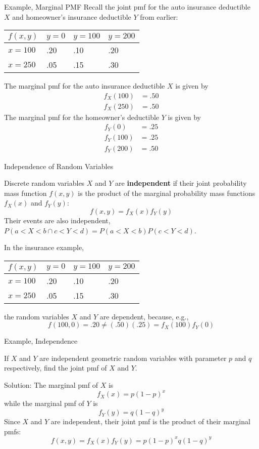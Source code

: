 \documentclass[handout]{beamer}
\begin{document}
\begin{frame}{Example, Marginal PMF}
    Recall the joint pmf for the auto insurance deductible $X$ and homeowner's insurance deductible $Y$ from earlier:
    \begin{center}
        \begin{tabular}{l||l|l|l}
            $f(x,y)$ & $y=0$ & $y=100$ & $y=200$ \\ \hline \hline
            $x=100$  & .20   & .10     & .20     \\ \hline
            $x=250$  & .05   & .15     & .30
        \end{tabular}
    \end{center}
    \pause The marginal pmf for the auto insurance deductible $X$ is given by
    \begin{align*}
        f_X(100) & = .50 \\
        f_X(250) & = .50
    \end{align*}
    \pause The marginal pmf for the homeowner's deductible $Y$ is given by
    \begin{align*}
        f_Y(0)   & = .25 \\
        f_Y(100) & = .25 \\
        f_Y(200) & = .50
    \end{align*}
\end{frame}
\begin{frame}{Independence of Random Variables}
    \begin{block}{}
        Discrete random variables $X$ and $Y$ are \textbf{independent} if their joint probability mass function $f(x,y)$ is the product of the marginal probability mass functions $f_X(x)$ and $f_Y(y)$:
        $$f(x,y) = f_X(x)f_Y(y)$$
        Their events are also independent, $P(a<X<b \cap c<Y<d) = P(a<X<b)P(c<Y<d)$.
    \end{block}

    In the insurance example,
    \begin{center}
        \begin{tabular}{l||l|l|l}
            $f(x,y)$ & $y=0$ & $y=100$ & $y=200$ \\ \hline \hline
            $x=100$  & .20   & .10     & .20     \\ \hline
            $x=250$  & .05   & .15     & .30
        \end{tabular}
    \end{center}
    the random variables $X$ and $Y$ are dependent, because, e.g.,
    $$f(100,0) = .20 \neq (.50)(.25) = f_X(100)f_Y(0)$$
\end{frame}
\begin{frame}{Example, Independence}
    \begin{block}{}
        If $X$ and $Y$ are independent geometric random variables with parameter $p$ and $q$ respectively, find the joint pmf of $X$ and $Y$.
    \end{block}
    \pause Solution: The marginal pmf of $X$ is
    $$f_X(x) = p(1-p)^x$$
    \pause while the marginal pmf of $Y$ is
    $$f_Y(y) = q(1-q)^y$$
    \pause Since $X$ and $Y$ are independent, their joint pmf is the product of their marginal pmfs:
    $$f(x,y) = f_X(x)f_Y(y) = p(1-p)^xq(1-q)^y$$
\end{frame}
\end{document}
